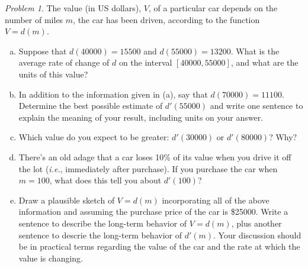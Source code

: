 \documentclass[11pt,twoside]{amsart}
\theoremstyle{plain}
\theoremstyle{remark}
\newtheorem{prob}{Problem}
\theoremstyle{definition}
\theoremstyle{definition}
\begin{document}
\begin{prob}
The value (in US dollars), $V$, of a particular car depends on the number of miles $m$, the car has been driven, according to the function $V=d(m)$.
\begin{enumerate}[(a)]
\item Suppose that $d(40000)=15500$ and $d(55000)=13200$. What is the average rate of change of $d$ on the interval $[40000,55000]$, and what are the units of this value?
\item In addition to the information given in (a), say that $d(70000)=11100$. Determine the best possible estimate of $d'(55000)$ and write one sentence to explain the meaning of your result, including units on your answer.
\item Which value do you expect to be greater: $d'(30000)$ or $d'(80000)$? Why?
\item There's an old adage that a car loses 10\% of its value when you drive it off the lot (\emph{i.e.}, immediately after purchase). If you purchase the car when $m=100$, what does this tell you about $d'(100)$?
\item Draw a plausible sketch of $V=d(m)$ incorporating all of the above information and assuming the purchase price of the car is \$25000. Write a sentence to describe the long-term behavior of $V=d(m)$, plus another sentence to descrie the long-term behavior of $d'(m)$. Your discussion should be in practical terms regarding the value of the car and the rate at which the value is changing.
\end{enumerate}
\end{prob}
\end{document}
